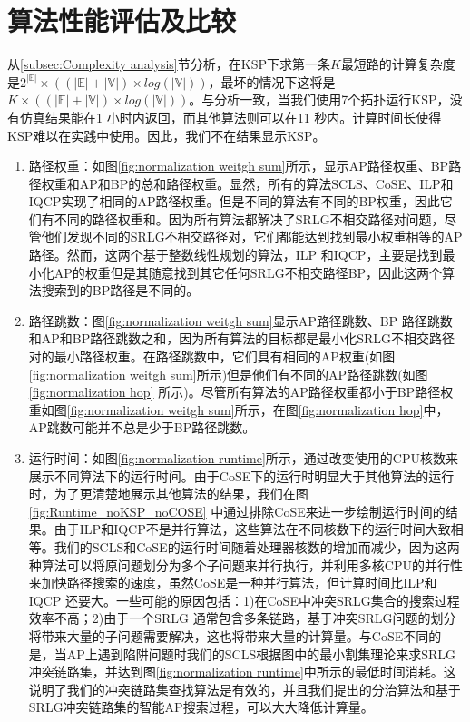 \section{算法性能评估及比较}
从\ref{subsec:Complexity analysis}节分析，在KSP下求第一条$K$最短路的计算复杂度是$2^{|\mathbb{E}|}\times ((|\mathbb{E}|+|\mathbb{V}|)\times log(|\mathbb{V}|))$，最坏的情况下这将是$K\times ((|\mathbb{E}|+|\mathbb{V}|)\times log(|\mathbb{V}|))$。与分析一致，当我们使用7个拓扑运行KSP，没有仿真结果能在1 小时内返回，而其他算法则可以在11 秒内。计算时间长使得KSP难以在实践中使用。因此，我们不在结果显示KSP。
\begin{enumerate}
  \item 路径权重：如图\ref{fig:normalization weitgh sum}所示，显示AP路径权重、BP路径权重和AP和BP的总和路径权重。显然，所有的算法SCLS、CoSE、ILP和IQCP实现了相同的AP路径权重。但是不同的算法有不同的BP权重，因此它们有不同的路径权重和。因为所有算法都解决了SRLG不相交路径对问题，尽管他们发现不同的SRLG不相交路径对，它们都能达到找到最小权重相等的AP路径。然而，这两个基于整数线性规划的算法，ILP 和IQCP，主要是找到最小化AP的权重但是其随意找到其它任何SRLG不相交路径BP，因此这两个算法搜索到的BP路径是不同的。
  \item 路径跳数：图\ref{fig:normalization weitgh sum}显示AP路径跳数、BP 路径跳数和AP和BP路径跳数之和，因为所有算法的目标都是最小化SRLG不相交路径对的最小路径权重。在路径跳数中，它们具有相同的AP权重(如图\ref{fig:normalization weitgh sum}所示)但是他们有不同的AP路径跳数(如图\ref{fig:normalization hop} 所示)。尽管所有算法的AP路径权重都小于BP路径权重如图\ref{fig:normalization weitgh sum}所示，在图\ref{fig:normalization hop}中，AP跳数可能并不总是少于BP路径跳数。
  \item 运行时间：如图\ref{fig:normalization runtime}所示，通过改变使用的CPU核数来展示不同算法下的运行时间。由于CoSE下的运行时明显大于其他算法的运行时，为了更清楚地展示其他算法的结果，我们在图\ref{fig:Runtime_noKSP_noCOSE} 中通过排除CoSE来进一步绘制运行时间的结果。由于ILP和IQCP不是并行算法，这些算法在不同核数下的运行时间大致相等。我们的SCLS和CoSE的运行时间随着处理器核数的增加而减少，因为这两种算法可以将原问题划分为多个子问题来并行执行，并利用多核CPU的并行性来加快路径搜索的速度，虽然CoSE是一种并行算法，但计算时间比ILP和IQCP 还要大。一些可能的原因包括：1)在CoSE中冲突SRLG集合的搜索过程效率不高；2)由于一个SRLG 通常包含多条链路，基于冲突SRLG问题的划分将带来大量的子问题需要解决，这也将带来大量的计算量。与CoSE不同的是，当AP上遇到陷阱问题时我们的SCLS根据图中的最小割集理论来求SRLG冲突链路集，并达到图\ref{fig:normalization runtime}中所示的最低时间消耗。这说明了我们的冲突链路集查找算法是有效的，并且我们提出的分治算法和基于SRLG冲突链路集的智能AP搜索过程，可以大大降低计算量。

\end{enumerate}
